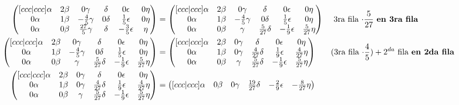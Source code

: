 \documentclass[letterpaper]{article}
\renewcommand{\*}{\cdot}
\theoremstyle{definition}
\begin{document}
\begin{align*}
		 \begin{pmatrix}[ccc|ccc]
		 \alpha & 2\beta & 0\gamma & \delta & 0\epsilon & 0\eta\\
		 0\alpha & 1\beta & -\frac{4}{5}\gamma& 0\delta & \frac{1}{5}\epsilon & 0\eta\\
		 0\alpha & 0\beta & \frac{27}{5}\gamma & \delta & -\frac{3}{5}\epsilon & \eta
		 \end{pmatrix} & = \begin{pmatrix}[ccc|ccc]
		 \alpha & 2\beta & 0\gamma & \delta & 0\epsilon & 0\eta\\
		 0\alpha & 1\beta & -\frac{4}{5}\gamma& 0\delta & \frac{1}{5}\epsilon & 0\eta\\
		 0\alpha & 0\beta & \gamma & \frac{5}{27}\delta & -\frac{1}{9}\epsilon & \frac{5}{27}\eta
		 \end{pmatrix} && \text{ 3ra fila $ \* \frac{5}{27}$ \textbf{en 3ra fila} }\\
		 \begin{pmatrix}[ccc|ccc]
		 \alpha & 2\beta & 0\gamma & \delta & 0\epsilon & 0\eta\\
		 0\alpha & 1\beta & -\frac{4}{5}\gamma& 0\delta & \frac{1}{5}\epsilon & 0\eta\\
		 0\alpha & 0\beta & \gamma & \frac{5}{27}\delta & -\frac{1}{9}\epsilon & \frac{5}{27}\eta
		 \end{pmatrix} &= \begin{pmatrix}[ccc|ccc]
		 \alpha & 2\beta & 0\gamma & \delta & 0\epsilon & 0\eta\\
		 0\alpha & 1\beta & 0\gamma& \frac{4}{27}\delta & \frac{1}{9}\epsilon & \frac{4}{27}\eta\\
		 0\alpha & 0\beta & \gamma & \frac{5}{27}\delta & -\frac{1}{9}\epsilon & \frac{5}{27}\eta
		 \end{pmatrix} && \text{(3ra fila $ \* \dfrac{4}{5}) + 2^{da} $  fila \textbf{en 2da fila} }\\
		 \begin{pmatrix}[ccc|ccc]
		 \alpha & 2\beta & 0\gamma & \delta & 0\epsilon & 0\eta\\
		 0\alpha & 1\beta & 0\gamma& \frac{4}{27}\delta & \frac{1}{9}\epsilon & \frac{4}{27}\eta\\
		 0\alpha & 0\beta & \gamma & \frac{5}{27}\delta & -\frac{1}{9}\epsilon & \frac{5}{27}\eta
		 \end{pmatrix} & = \begin{pmatrix}[ccc|ccc]
		 \alpha & 0\beta & 0\gamma & \frac{19}{27}\delta & -\frac{2}{9}\epsilon & -\frac{8}{27}\eta\\

\end{pmatrix}
\end{align*}
\end{document}
